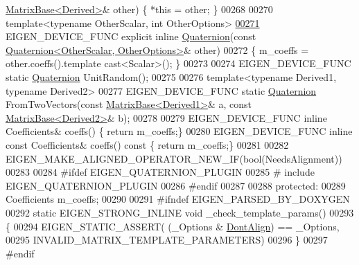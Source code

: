 \begin{DoxyCode}
      \hyperlink{group___core___module_class_eigen_1_1_matrix_base}{MatrixBase<Derived>}& other) \{ *\textcolor{keyword}{this} = other; \}
00268 
00270   \textcolor{keyword}{template}<\textcolor{keyword}{typename} OtherScalar, \textcolor{keywordtype}{int} OtherOptions>
\hyperlink{group___geometry___module_af6430466427b40d7ed79bfb6818cccc2}{00271}   EIGEN\_DEVICE\_FUNC \textcolor{keyword}{explicit} \textcolor{keyword}{inline} \hyperlink{group___geometry___module_af6430466427b40d7ed79bfb6818cccc2}{Quaternion}(\textcolor{keyword}{const} 
      \hyperlink{group___geometry___module_class_eigen_1_1_quaternion}{Quaternion<OtherScalar, OtherOptions>}& other)
00272   \{ m\_coeffs = other.coeffs().template cast<Scalar>(); \}
00273 
00274   EIGEN\_DEVICE\_FUNC \textcolor{keyword}{static} \hyperlink{group___geometry___module_class_eigen_1_1_quaternion}{Quaternion} UnitRandom();
00275 
00276   \textcolor{keyword}{template}<\textcolor{keyword}{typename} Derived1, \textcolor{keyword}{typename} Derived2>
00277   EIGEN\_DEVICE\_FUNC \textcolor{keyword}{static} \hyperlink{group___geometry___module_class_eigen_1_1_quaternion}{Quaternion} FromTwoVectors(\textcolor{keyword}{const} 
      \hyperlink{group___core___module_class_eigen_1_1_matrix_base}{MatrixBase<Derived1>}& a, \textcolor{keyword}{const} \hyperlink{group___core___module_class_eigen_1_1_matrix_base}{MatrixBase<Derived2>}& b);
00278 
00279   EIGEN\_DEVICE\_FUNC \textcolor{keyword}{inline} Coefficients& coeffs() \{ \textcolor{keywordflow}{return} m\_coeffs;\}
00280   EIGEN\_DEVICE\_FUNC \textcolor{keyword}{inline} \textcolor{keyword}{const} Coefficients& coeffs()\textcolor{keyword}{ const }\{ \textcolor{keywordflow}{return} m\_coeffs;\}
00281 
00282   EIGEN\_MAKE\_ALIGNED\_OPERATOR\_NEW\_IF(\textcolor{keywordtype}{bool}(NeedsAlignment))
00283   
00284 \textcolor{preprocessor}{#ifdef EIGEN\_QUATERNION\_PLUGIN}
00285 \textcolor{preprocessor}{# include EIGEN\_QUATERNION\_PLUGIN}
00286 \textcolor{preprocessor}{#endif}
00287 
00288 \textcolor{keyword}{protected}:
00289   Coefficients m\_coeffs;
00290   
00291 \textcolor{preprocessor}{#ifndef EIGEN\_PARSED\_BY\_DOXYGEN}
00292     \textcolor{keyword}{static} EIGEN\_STRONG\_INLINE \textcolor{keywordtype}{void} \_check\_template\_params()
00293     \{
00294       EIGEN\_STATIC\_ASSERT( (\_Options & \hyperlink{group__enums_ggaacded1a18ae58b0f554751f6cdf9eb13a40a452614141522dd313363dbbd65726}{DontAlign}) == \_Options,
00295         INVALID\_MATRIX\_TEMPLATE\_PARAMETERS)
00296     \}
00297 \textcolor{preprocessor}{#endif}

\end{DoxyCode}
